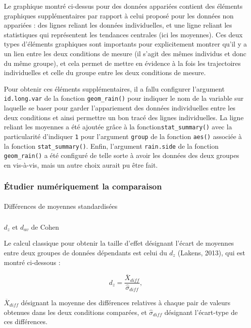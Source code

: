 \documentclass[
  letterpaper,
]{book}
\makeatletter
\let\oldparagraph\paragraph
\renewcommand{\paragraph}{
    \@ifstar
      \xxxParagraphStar
      \xxxParagraphNoStar
  }
\newcommand{\xxxParagraphStar}[1]{\oldparagraph*{#1}\mbox{}}
\newcommand{\xxxParagraphNoStar}[1]{\oldparagraph{#1}\mbox{}}
\let\oldsubparagraph\subparagraph
\renewcommand{\subparagraph}{
    \@ifstar
      \xxxSubParagraphStar
      \xxxSubParagraphNoStar
  }
\newcommand{\xxxSubParagraphStar}[1]{\oldsubparagraph*{#1}\mbox{}}
\newcommand{\xxxSubParagraphNoStar}[1]{\oldsubparagraph{#1}\mbox{}}
\makeatother
\begin{document}
Le graphique montré ci-dessus pour des données appariées contient des
éléments graphiques supplémentaires par rapport à celui proposé pour les
données non appariées : des lignes reliant les données individuelles, et
une ligne reliant les statistiques qui représentent les tendances
centrales (ici les moyennes). Ces deux types d'éléments graphiques sont
importants pour explicitement montrer qu'il y a un lien entre les deux
conditions de mesure (il s'agit des mêmes individus et donc du même
groupe), et cela permet de mettre en évidence à la fois les trajectoires
individuelles et celle du groupe entre les deux conditions de mesure.

Pour obtenir ces éléments supplémentaires, il a fallu configurer
l'argument \texttt{id.long.var} de la fonction \texttt{geom\_rain()}
pour indiquer le nom de la variable sur laquelle se baser pour garder
l'appariement des données individuelles entre les deux conditions et
ainsi permettre un bon tracé des lignes individuelles. La ligne reliant
les moyennes a été ajoutée grâce à la fonction\texttt{stat\_summary()}
avec la particularité d'indiquer \texttt{1} pour l'argument
\texttt{group} de la fonction \texttt{aes()} associée à la fonction
\texttt{stat\_summary()}. Enfin, l'argument \texttt{rain.side} de la
fonction \texttt{geom\_rain()} a été configuré de telle sorte à avoir
les données des deux groupes en vis-à-vis, mais un autre choix aurait pu
être fait.

\subsubsection{Étudier numériquement la
comparaison}\label{uxe9tudier-numuxe9riquement-la-comparaison-1}

\paragraph{Différences de moyennes
standardisées}\label{diffuxe9rences-de-moyennes-standardisuxe9es-2}

\subparagraph{\texorpdfstring{\(d_{z}\) et \(d_{av}\) de
Cohen}{d\_\{z\} et d\_\{av\} de Cohen}}\label{d_z-et-d_av-de-cohen}

Le calcul classique pour obtenir la taille d'effet désignant l'écart de
moyennes entre deux groupes de données dépendants est celui du \(d_{z}\)
(Lakens, 2013), qui est montré ci-dessous :

\[d_{z} = \frac{\overline{X} _{diff}}{\hat{\sigma}_{diff}},\]

\(\overline{X}_{diff}\) désignant la moyenne des différences relatives à
chaque pair de valeurs obtenues dans les deux conditions comparées, et
\(\hat{\sigma}_{diff}\) désignant l'écart-type de ces différences.
\end{document}
